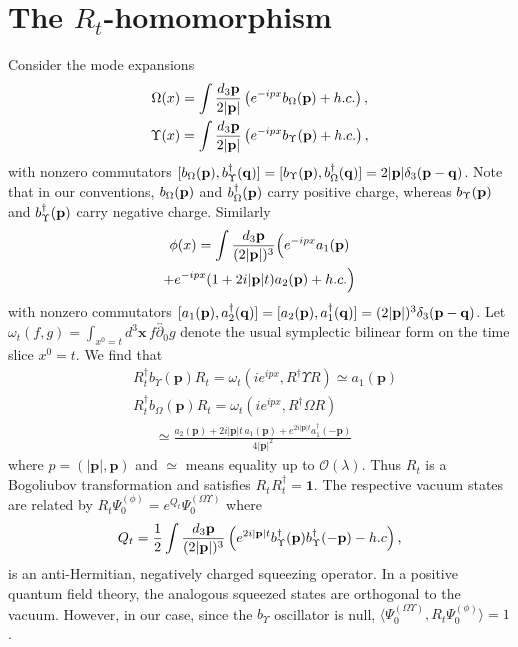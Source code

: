 \documentclass[pra,aps,amsmath,amssymb,notitlepage, twocolumn,superscriptaddress,longbibliography,nofootinbib,floatfix,10pt]{revtex4-2}
\begin{document}
\section{The \texorpdfstring{$R_t$}{Rt}-homomorphism}\label{app:R_map}
Consider the mode expansions
\begin{align}
    \Omega(x)&=\int \frac{d_3 {\bf p} }{2 |{\bf p}|} \left(e^{-i px} b_{\Omega}({\bf p}) +h.c. \right), \\
    \Upsilon(x) &=\int \frac{d_3 {\bf p}}{ 2 |{\bf p}|} \left(e^{-i px} b_{\Upsilon}({\bf p}) +h.c. \right),
\end{align}
with nonzero commutators $[b_{\Omega}({\bf p}),b^\dagger_{\Upsilon}({\bf q})]=[b_{\Upsilon}({\bf p}),b^\dagger_{\Omega}({\bf q})]=2 |{\bf p}|\delta_3(\mathbf{p}-\mathbf{q})$. Note that in our conventions, $b_{\Omega}({\bf p})$ and $b_{\Omega}^\dagger({\bf p})$ carry positive charge, whereas $b_{\Upsilon}({\bf p})$ and $b_{\Upsilon}^\dagger({\bf p})$ carry negative charge. Similarly
\begin{multline}
    \phi(x)=\int \frac{d_3 \mathbf{p}}{(2 |{\bf p}|)^3} \Bigl(e^{-ipx} a_1({\bf p})\\
    + e^{-ipx} (1+2i|\mathbf{p}|t) a_2(\mathbf{p}) + h.c. \Bigr)
\end{multline}
with nonzero commutators $[a_{1}({\bf p}),a^\dagger_{2}({\bf q})]=[a_{2}({\bf p}),a^\dagger_{1}({\bf q})]=(2 |{\bf p}|)^3\delta_3(\mathbf{p}-\mathbf{q})$.
Let $\omega_t(f,g)=\int_{x^0=t}d^3\mathbf{x\,}f\overleftrightarrow{\partial_0}g$ denote the usual symplectic bilinear form on the time slice $x^0=t$. We find that
\begin{align}
    &R^\dagger_t b_{\Upsilon}(\mathbf{p}) R_t = \omega_t\left( i e^{ipx} , R^\dagger \Upsilon R\right) \simeq a_1(\mathbf{p}) \\
    &R^\dagger_t b_{\Omega}(\mathbf{p}) R_t = \omega_t\left( i e^{ipx} , R^\dagger \Omega R\right) \nonumber\\
    &\;\;\quad \simeq \frac{a_2(\mathbf{p}) + 2i|\mathbf{p}|t \, a_1(\mathbf{p}) + e^{2i|\mathbf{p}|t} a_1^\dagger(-\mathbf{p})}{4|\mathbf{p}|^2}
\end{align}
where $p=(|\mathbf{p}|,\mathbf{p})$ and $\simeq$ means equality up to $\mathcal{O}(\lambda)$. Thus $R_t$ is a Bogoliubov transformation and satisfies $R_t^{\phantom{\dagger}}R_t^\dagger=\mathbf{1}$. The respective vacuum states are related by $R_t\Psi_0^{(\phi)}=e^{Q_t}\Psi_0^{(\Omega\Upsilon)}$ where
\begin{equation}
    Q_t= \frac12 \int \frac{d_3 {\bf p}}{(2 |{\bf p}|)^3}\left( e^{2 i |{\bf p}|t} b^\dagger_{\Upsilon}({\bf p}) b^\dagger_{\Upsilon}(-{\bf p})  -h.c \right),
\end{equation}
is an anti-Hermitian, negatively charged squeezing operator. In a positive quantum field theory, the analogous squeezed states are orthogonal to the vacuum. However, in our case, since the $b_\Upsilon$ oscillator is null, $\langle \Psi_0^{(\Omega\Upsilon)}, R_t  \Psi_0^{(\phi)}\rangle=1$.
\end{document}
